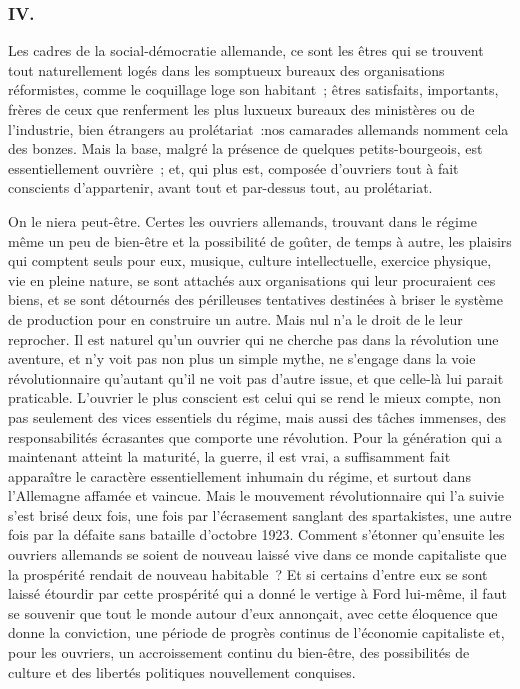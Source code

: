 \documentclass[french,twoside]{book} %
\begin{document}
\subsubsection[{IV.}]{IV.}
\noindent Les cadres de la social-démocratie allemande, ce sont les êtres qui se trouvent tout naturellement logés dans les somptueux bureaux des organi­sations réformistes, comme le coquillage loge son habitant ; êtres satisfaits, importants, frères de ceux que renferment les plus luxueux bureaux des ministères ou de l'industrie, bien étrangers au prolétariat :nos camarades allemands nomment cela des bonzes. Mais la base, malgré la présence de quelques petits-bourgeois, est essentiellement ouvrière ; et, qui plus est, composée d'ouvriers tout à fait conscients d'appartenir, avant tout et par-dessus tout, au prolétariat.\par
On le niera peut-être. Certes les ouvriers allemands, trouvant dans le régime même un peu de bien-être et la possibilité de goûter, de temps à autre, les plaisirs qui comptent seuls pour eux, musique, culture intellectuelle, exer­cice physique, vie en pleine nature, se sont attachés aux organisations qui leur procuraient ces biens, et se sont détournés des périlleuses tentatives destinées à briser le système de production pour en construire un autre. Mais nul n'a le droit de le leur reprocher. Il est naturel qu'un ouvrier qui ne cherche pas dans la révolution une aventure, et n'y voit pas non plus un simple mythe, ne s'engage dans la voie révolutionnaire qu'autant qu'il ne voit pas d'autre issue, et que celle-là lui parait praticable. L'ouvrier le plus conscient est celui qui se rend le mieux compte, non pas seulement des vices essentiels du régime, mais aussi des tâches immenses, des responsabilités écrasantes que comporte une révolution. Pour la génération qui a maintenant atteint la maturité, la guerre, il est vrai, a suffisamment fait apparaître le caractère essentiellement inhumain du régime, et surtout dans l'Allemagne affamée et vaincue. Mais le mouve­ment révolutionnaire qui l'a suivie s'est brisé deux fois, une fois par l'écrase­ment sanglant des spartakistes, une autre fois par la défaite sans bataille d'octobre 1923. Comment s'étonner qu'ensuite les ouvriers allemands se soient de nouveau laissé vive dans ce monde capitaliste que la prospérité rendait de nouveau habitable ? Et si certains d'entre eux se sont laissé étourdir par cette prospérité qui a donné le vertige à Ford lui-même, il faut se souvenir que tout le monde autour d'eux annonçait, avec cette éloquence que donne la convic­tion, une période de progrès continus de l'économie capitaliste et, pour les ouvriers, un accroissement continu du bien-être, des possibilités de culture et des libertés politiques nouvellement conquises.\par
\end{document}
